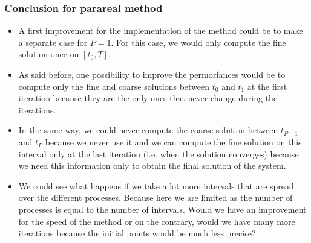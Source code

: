\subsubsection{Conclusion for parareal method}
\label{improve}

\begin{itemize}[label=-]
	\item A first improvement for the implementation of the method could be to make a separate case for $P=1$. For this case, we would only compute the fine solution once on $[t_0,T]$.
	\item As said before, one possibility to improve the permorfances would be to compute only the fine and coarse solutions between $t_0$ and $t_1$ at the first iteration because they are the only ones that never change during the iterations. 
	\item In the same way, we could never compute the coarse solution between $t_{P-1}$ and $t_P$ because we never use it and we can compute the fine solution on this interval only at the last iteration (i.e. when the solution converges) because we need this information only to obtain the final solution of the system.
	\item We could see what happens if we take a lot more intervals that are spread over the different processes. Because here we are limited as the number of processes is equal to the number of intervals. Would we have an improvement for the speed of the method or on the contrary, would we have many more iterations because the initial points would be much less precise?
\end{itemize}